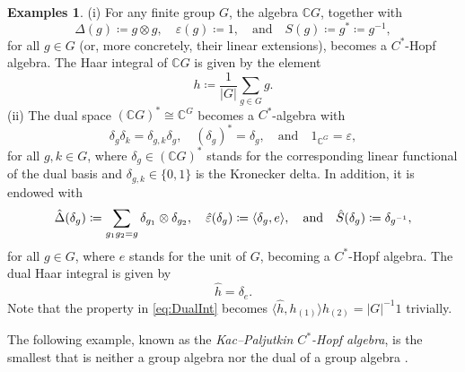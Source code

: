 \documentclass[a4paper,10pt]{amsart}
\newcommand{\eval}[2]{\langle #1 , #2\rangle}
\newcommand{\newterm}[1]{\emph{#1}}
\theoremstyle{definition}
\newtheorem{examples}[theorem]{Examples}
\begin{document}
\begin{examples}
\label{examples:CG}
	(i)
	For any finite group $G$, the algebra $\mathbb{C}G$, together with
	\begin{equation*}
        \Delta(g)  \coloneqq  g\otimes g,
        \quad
        \varepsilon(g)  \coloneqq 
        1,
        \quad
        \text{and}
        \quad
        S(g)  \coloneqq  g^*  \coloneqq  g^{-1},
    \end{equation*}
	for all $g\in G$
	(or, more concretely, their linear extensions), becomes a $C^*$-Hopf algebra.
    The Haar integral of $\mathbb{C}G$ is given by the element
	\begin{equation*}
        h  \coloneqq \frac{1}{|G|}\sum_{g\in G} g.
    \end{equation*}
	(ii)
	The dual space $(\mathbb{C}G)^* \cong \mathbb{C}^G$ becomes a $C^*$-algebra with
	\begin{equation*}
        \delta_g \delta_k = \delta_{g,k} \delta_g,
        \quad
        (\delta_g)^* = \delta_g,
        \quad
        \text{and}
        \quad
        1_{\mathbb{C}^G} = \varepsilon,
    \end{equation*}
    for all $g,k\in G$, where $\delta_g\in (\mathbb{C}G)^*$ stands for the corresponding linear functional of the dual basis and $\delta_{g,k}\in\{0,1\}$ is the Kronecker delta. In addition, it is endowed with
    \begin{equation*}
    \hat\Delta(\delta_g)
         \coloneqq  \sum_{g_1 g_2 = g} \delta_{g_1} \otimes \delta_{g_2},
    \quad
    \hat\varepsilon(\delta_g)
         \coloneqq  \eval{\delta_g}{e},
    \quad
        \text{and}
        \quad
    \hat{S}(\delta_g)
         \coloneqq  \delta_{\smash{g^{-1}}},
    \end{equation*}
    for all $g\in G$, where $e$ stands for the unit of $G$, becoming a $C^*$-Hopf algebra.
    The dual Haar integral is given by
	\begin{equation*}
        \hat{h} = \delta_e.
    \end{equation*}
    Note that the property in \cref{eq:DualInt} becomes 
	$\eval{\hat{h}}{h_{(1)}} h_{(2)} = |G|^{-1} 1$ trivially.
\end{examples}

The following example, known as the \newterm{Kac–Paljutkin $C^*$-Hopf algebra}, is the smallest that is neither a group algebra nor the dual of a group algebra \cite{kac_finite_1966}.
\end{document}
